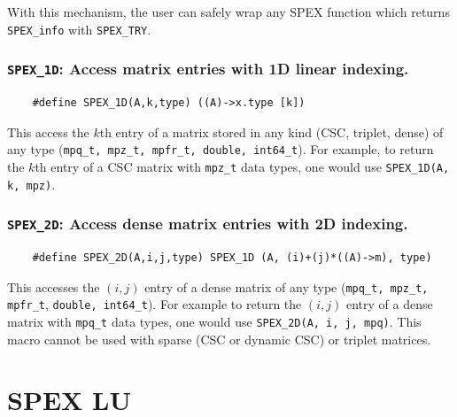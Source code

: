 \documentclass[12pt,oneside]{book}
\theoremstyle{definition}
\begin{document}
With this mechanism, the user can safely wrap any SPEX function which returns \verb|SPEX_info| with \verb|SPEX_TRY|.

\subsection{\texttt{SPEX\_1D}: Access matrix entries with 1D linear indexing.}

\begin{mdframed}[userdefinedwidth=\textwidth]
{\footnotesize
\begin{verbatim}
    #define SPEX_1D(A,k,type) ((A)->x.type [k])
\end{verbatim}
} \end{mdframed}

This access the $k$th entry of a matrix stored in any kind (CSC, triplet, dense) of any type
(\verb'mpq_t, mpz_t, mpfr_t, double, int64_t'). For example, to return the $k$th entry of a CSC matrix with \verb|mpz_t| data types, one would use \verb|SPEX_1D(A, k, mpz)|.

\subsection{\texttt{SPEX\_2D}: Access dense matrix entries with 2D indexing.}

\begin{mdframed}[userdefinedwidth=\textwidth]
{\footnotesize
\begin{verbatim}
    #define SPEX_2D(A,i,j,type) SPEX_1D (A, (i)+(j)*((A)->m), type)
\end{verbatim}
} \end{mdframed}

This accesses the $(i,j)$ entry of a dense matrix of any type (\verb'mpq_t, mpz_t, mpfr_t', 
\verb'double, int64_t'). For example to return the $(i,j)$ entry of a dense matrix with \verb|mpq_t| data types, one would use \verb|SPEX_2D(A, i, j, mpq)|.  This macro cannot be used
with sparse (CSC or dynamic CSC) or triplet matrices.

\chapter{SPEX LU}\vspace{-0.75in} \label{ch:LeftLU}
\end{document}
